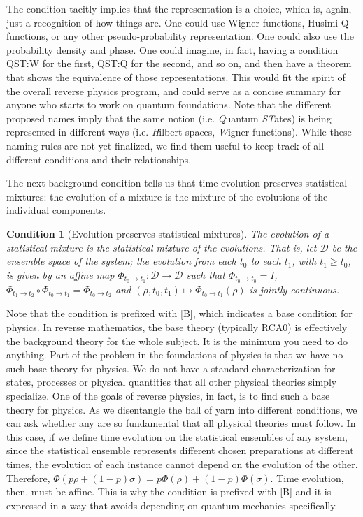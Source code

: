 \documentclass[entropy,article,submit,moreauthors]{Definitions/mdpi}
\newtheorem{condth}{Condition}
\renewcommand*{\thecondth}{\Roman{condth}}
\newenvironment{condition}[2][]{\renewcommand{\thecondth}{#2}\begin{condth}[#1]\label{#2}}{\end{condth}\renewcommand{\thecondth}{\Roman{condth}}}
\begin{document}
The condition tacitly implies that the representation is a choice, which is, again, just a recognition of how things are. One could use Wigner functions, Husimi Q functions, or any other pseudo-probability representation. One could also use the probability density and phase. One could imagine, in fact, having a condition QST:W for the first, QST:Q for the second, and so on, and then have a theorem that shows the equivalence of those representations. This would fit the spirit of the overall reverse physics program, and could serve as a concise summary for anyone who starts to work on quantum foundations. Note that the different proposed names imply that the same notion (i.e. \emph{Q}uantum \emph{ST}ates) is being represented in different ways (i.e. \emph{H}ilbert spaces, \emph{W}igner functions). While these naming rules are not yet finalized, we find them useful to keep track of all different conditions and their relationships.

The next background condition tells us that time evolution preserves statistical mixtures: the evolution of a mixture is the mixture of the evolutions of the individual components.
\begin{condition}[Evolution preserves statistical mixtures]{[B]EVMIX}
	The evolution of a statistical mixture is the statistical mixture of the evolutions. That is, let $\mathcal{D}$ be the ensemble space of the system; the evolution from each $t_0$ to each $t_1$, with $t_1\geq t_0$, is given by an affine map $\Phi_{t_0 \to t_1}:\mathcal{D}\to \mathcal{D}$ such that $\Phi_{t_0 \to t_0}=I$, $\Phi_{t_1 \to t_2}\circ \Phi_{t_0 \to t_1}=\Phi_{t_0 \to t_2}$ and $(\rho,t_0,t_1)\mapsto \Phi_{t_0 \to t_1}(\rho)$ is jointly continuous.
\end{condition}
Note that the condition is prefixed with [B], which indicates a base condition for physics. In reverse mathematics, the base theory (typically RCA0) is effectively the background theory for the whole subject. It is the minimum you need to do anything. Part of the problem in the foundations of physics is that we have no such base theory for physics. We do not have a standard characterization for states, processes or physical quantities that all other physical theories simply specialize. One of the goals of reverse physics, in fact, is to find such a base theory for physics. As we disentangle the ball of yarn into different conditions, we can ask whether any are so fundamental that all physical theories must follow. In this case, if we define time evolution on the statistical ensembles of any system, since the statistical ensemble represents different chosen preparations at different times, the evolution of each instance cannot depend on the evolution of the other. Therefore, $\Phi(p\rho + (1-p)\sigma) = p \Phi(\rho) + (1-p) \Phi(\sigma)$. Time evolution, then, must be affine. This is why the condition is prefixed with [B] and it is expressed in a way that avoids depending on quantum mechanics specifically.
\end{document}

